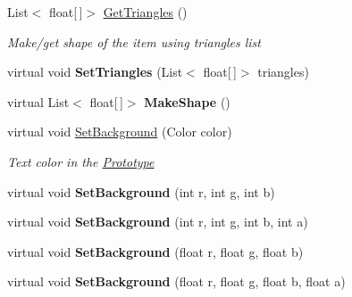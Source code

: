 \begin{DoxyCompactItemize}
List$<$ float\mbox{[}$\,$\mbox{]}$>$ \mbox{\hyperlink{class_space_v_i_l_1_1_prototype_af033781dfb15abb603274625f90d97de}{Get\+Triangles}} ()
\begin{DoxyCompactList}\small\item\em Make/get shape of the item using triangles list \end{DoxyCompactList}\item 
\mbox{\label{class_space_v_i_l_1_1_prototype_a5373e9f5a6babc04e5106a88e5fcdec0}} 
virtual void {\bfseries Set\+Triangles} (List$<$ float\mbox{[}$\,$\mbox{]}$>$ triangles)
\item 
\mbox{\label{class_space_v_i_l_1_1_prototype_a7e38cb4a418d0d5c0540c7096f4ba7b2}} 
virtual List$<$ float\mbox{[}$\,$\mbox{]}$>$ {\bfseries Make\+Shape} ()
\item 
virtual void \mbox{\hyperlink{class_space_v_i_l_1_1_prototype_aa35761db5812bd6125ab380ad38b9a46}{Set\+Background}} (Color color)
\begin{DoxyCompactList}\small\item\em Text color in the \mbox{\hyperlink{class_space_v_i_l_1_1_prototype}{Prototype}} \end{DoxyCompactList}\item 
\mbox{\label{class_space_v_i_l_1_1_prototype_a7d1149f007bb6d6b00186d7f377116a9}} 
virtual void {\bfseries Set\+Background} (int r, int g, int b)
\item 
\mbox{\label{class_space_v_i_l_1_1_prototype_ab980a997f26e810531835f139241e9af}} 
virtual void {\bfseries Set\+Background} (int r, int g, int b, int a)
\item 
\mbox{\label{class_space_v_i_l_1_1_prototype_a665418547d0f15181b8562b3b568b19a}} 
virtual void {\bfseries Set\+Background} (float r, float g, float b)
\item 
\mbox{\label{class_space_v_i_l_1_1_prototype_a1eac755b90e8249d3ee431e514e0e5de}} 
virtual void {\bfseries Set\+Background} (float r, float g, float b, float a)
\item 
\mbox{\label{class_space_v_i_l_1_1_prototype_a3aa267258c8a67b527b1e1c20a664023}} 

\end{DoxyCompactItemize}
